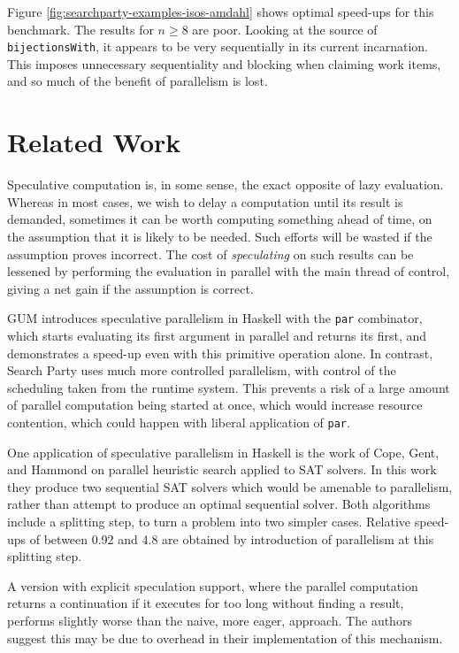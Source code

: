 Figure \ref{fig:searchparty-examples-isos-amdahl} shows optimal
speed-ups for this benchmark. The results for $n \geq 8$ are
poor. Looking at the source of \verb|bijectionsWith|, it appears to be
very sequentially in its current incarnation. This imposes unnecessary
sequentiality and blocking when claiming work items, and so much of
the benefit of parallelism is lost.

\section{Related Work}
\label{sec:searchparty-related}

Speculative computation\cite{spec} is, in some sense, the exact
opposite of lazy evaluation. Whereas in most cases, we wish to delay a
computation until its result is demanded, sometimes it can be worth
computing something ahead of time, on the assumption that it is likely
to be needed. Such efforts will be wasted if the assumption proves
incorrect. The cost of \textit{speculating} on such results can be
lessened by performing the evaluation in parallel with the main thread
of control, giving a net gain if the assumption is correct.

GUM\cite{gum} introduces speculative parallelism in Haskell with the
\verb|par| combinator, which starts evaluating its first argument in
parallel and returns its first, and demonstrates a speed-up even with
this primitive operation alone. In contrast, Search Party uses much
more controlled parallelism, with control of the scheduling taken from
the runtime system. This prevents a risk of a large amount of parallel
computation being started at once, which would increase resource
contention, which could happen with liberal application of \verb|par|.

One application of speculative parallelism in Haskell is the work of
Cope, Gent, and Hammond on parallel heuristic search\cite{parsat}
applied to SAT solvers. In this work they produce two sequential SAT
solvers which would be amenable to parallelism, rather than attempt to
produce an optimal sequential solver. Both algorithms include a
splitting step, to turn a problem into two simpler cases. Relative
speed-ups of between 0.92 and 4.8 are obtained by introduction of
parallelism at this splitting step.

A version with explicit speculation support, where the parallel
computation returns a continuation if it executes for too long without
finding a result, performs slightly worse than the naive, more eager,
approach. The authors suggest this may be due to overhead in their
implementation of this mechanism.

